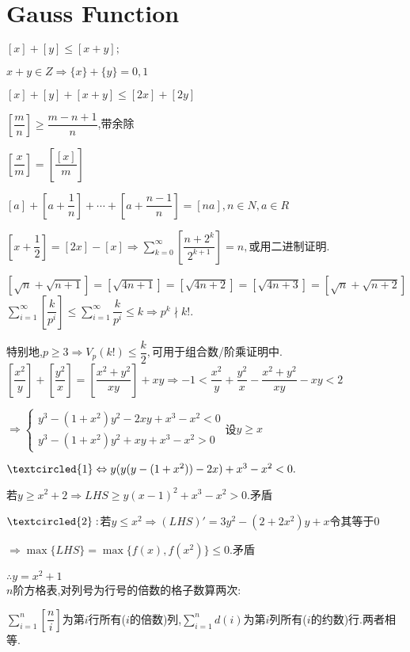 \section{Gauss Function} 
$ [x]+[y]\le [x+y];$

$ x+y\in Z\Rightarrow \{x\}+\{y\}=0,1$

$[x]+[y]+[x+y]\le [2x]+[2y] $

$ [\dfrac{m}{n}]\ge \dfrac{m-n+1}{n} $,带余除

$ [\dfrac{x}{m}]=[\dfrac{[x]}{m}]$

$ [a]+[a+\dfrac{1}{n}]+\cdots+[a+\dfrac{n-1}{n}]=[na],n\in N,a \in R$

$ [x+\dfrac{1}{2}]=[2x]-[x]\Rightarrow \sum_{k=0}^{\infty}{[\dfrac{n+2^k}{2^{k+1}}]}=n,$或用二进制证明.

$ [\sqrt{n}+\sqrt{n+1}]=[\sqrt{4n+1}]=[\sqrt{4n+2}]=[\sqrt{4n+3}]=[\sqrt{n}+\sqrt{n+2}]$
\\

$ \sum_{i=1}^{\infty}{[\dfrac{k}{p^i}]}\le \sum_{i=1}^{\infty}{\dfrac{k}{p^i}}\le k\Rightarrow p^k \nmid k!.$

特别地,$ p\ge 3\Rightarrow V_p(k!)\le \dfrac{k}{2},$可用于组合数/阶乘证明中.
\\

$ [\dfrac{x^2}{y}]+[\dfrac{y^2}{x}]=[\dfrac{x^2+y^2}{xy}]+xy\Rightarrow -1<\dfrac{x^2}{y}+\dfrac{y^2}{x}-\dfrac{x^2+y^2}{xy}-xy<2$

$ \Rightarrow \begin{cases} y^3-(1+x^2)y^2-2xy+x^3-x^2<0 \\ y^3-(1+x^2)y^2+xy+x^3-x^2>0 \end{cases}  $设$ y\ge x$

$ \textcircled{1}\Leftrightarrow y(y(y-(1+x^2))-2x)+x^3-x^2<0.$

若$ y\ge x^2+2\Rightarrow LHS\ge y(x-1)^2+x^3-x^2>0$.矛盾

$ \textcircled{2}:$若$ y\le x^2\Rightarrow (LHS)'=3y^2-(2+2x^2)y+x $令其等于$ 0$ 

$\Rightarrow \max\{LHS\}=\max\{f(x),f(x^2)\}\le 0$.矛盾

$ \therefore y=x^2+1$
\\

$ n$阶方格表,对列号为行号的倍数的格子数算两次:

$ \sum_{i=1}^{n}{[\dfrac{n}{i}]}$为第$ i$行所有($ i$的倍数)列,$ \sum_{i=1}^{n}{d(i)}$为第$ i$列所有($ i$的约数)行.两者相等.

